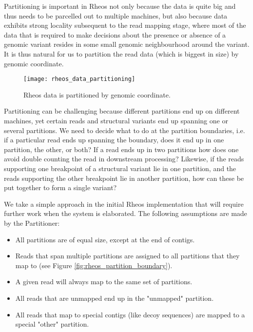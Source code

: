 Partitioning is important in Rheos not only because the data is quite big and thus needs to be parcelled out to multiple machines, but also because data exhibits strong locality subsequent to the read mapping stage, where most of the data that is required to make decisions about the presence or absence of a genomic variant resides in some small genomic neighbourhood around the variant. It is thus natural for us to partition the read data (which is biggest in size) by genomic coordinate.

\begin{figure}[H]
    \texttt{[image: rheos\_data\_partitioning]}
    \centering
    \caption {Rheos data is partitioned by genomic coordinate.}
    \label{fig:rheos_data_partitioning}
\end{figure}

Partitioning can be challenging because different partitions end up on different machines, yet certain reads and structural variants end up spanning one or several partitions. We need to decide what to do at the partition boundaries, i.e. if a particular read ends up spanning the boundary, does it end up in one partition, the other, or both? If a read ends up in two partitions how does one avoid double counting the read in downstream processing? Likewise, if the reads supporting one breakpoint of a structural variant lie in one partition, and the reads supporting the other breakpoint lie in another partition, how can these be put together to form a single variant?

We take a simple approach in the initial Rheos implementation that will require further work when the system is elaborated. The following assumptions are made by the Partitioner:

\begin{itemize}
    \item All partitions are of equal size, except at the end of contigs.
    \item Reads that span multiple partitions are assigned to all partitions that they map to (see Figure \ref{fig:rheos_partition_boundary}).
    \item A given read will always map to the same set of partitions.
    \item All reads that are unmapped end up in the "unmapped" partition.
    \item All reads that map to special contigs (like decoy sequences) are mapped to a special "other" partition.
\end{itemize}

